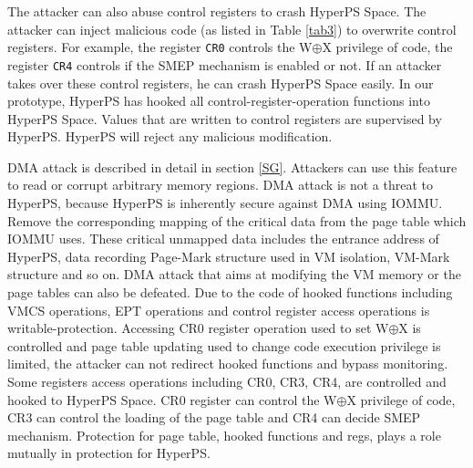 The attacker can also abuse control registers to crash HyperPS Space. The attacker can inject malicious code (as listed in Table \ref{tab3}) to overwrite control registers.  
For example, the register \verb|CR0| controls the W$\oplus${X} privilege of code, the register \verb|CR4| controls if the SMEP mechanism is enabled or not. If an attacker takes over these control registers, he can crash HyperPS Space easily.
In our prototype, HyperPS has hooked all control-register-operation functions into HyperPS Space. Values that are written to control registers are supervised by HyperPS. HyperPS will reject any malicious modification.







\iffalse
DMA attack is described in detail in section \ref{SG}. Attackers can use this feature to read or corrupt arbitrary memory regions. DMA attack is not a threat to HyperPS, because HyperPS is inherently secure against DMA using IOMMU. Remove the corresponding mapping of the critical data from the page table which IOMMU uses. These critical unmapped data includes the entrance address of HyperPS, data recording Page-Mark structure used in VM isolation, VM-Mark structure and so on. DMA attack that aims at modifying the VM memory or the page tables can also be defeated.
Due to the code of hooked functions including VMCS operations, EPT operations and control register access operations is writable-protection. Accessing CR0 register operation used to set W$\oplus${X} is controlled and page table updating used to change code execution privilege is limited, the attacker can not redirect hooked functions and bypass monitoring.
Some registers access operations including CR0, CR3, CR4, are controlled and hooked to HyperPS Space. CR0 register can control the W$\oplus${X} privilege of code, CR3 can control the loading of the page table and CR4 can decide SMEP mechanism. Protection for page table, hooked functions and regs, plays a role mutually in protection for HyperPS. 

